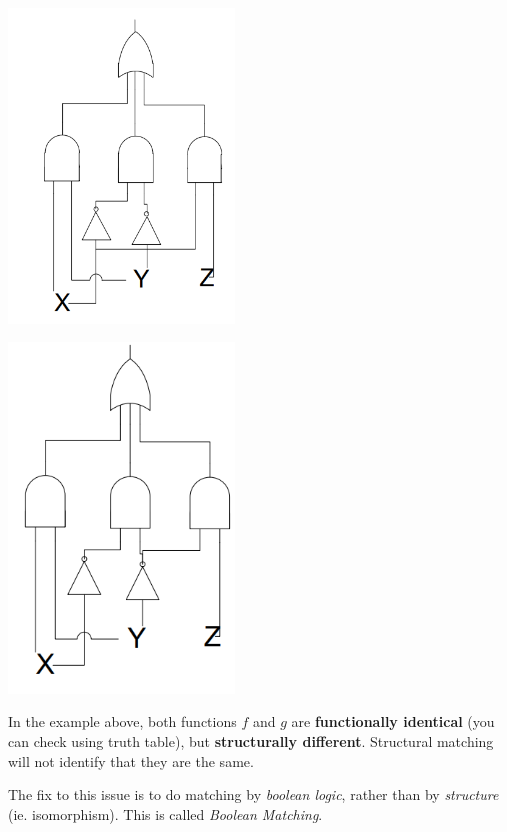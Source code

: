\documentclass{article}
\begin{document}
\begin{minipage}[t]{0.5\textwidth}
    \centering
    \includegraphics[width=6cm, scale=1]{S4/structural1.PNG}
    \captionsetup{justification=centering}
\end{minipage}%
\begin{minipage}[t]{0.5\textwidth}
    \centering
    \includegraphics[width=6cm, scale=1]{S4/structural2.PNG}
    \captionsetup{justification=centering}
\end{minipage}%

In the example above, both functions $f$ and $g$ are \textbf{functionally identical} (you can check using truth table), but \textbf{structurally different}.
Structural matching will not identify that they are the same.

The fix to this issue is to do matching by \textit{boolean logic}, rather than by \textit{structure} (ie. isomorphism). This is called \textit{Boolean Matching}.
\end{document}
